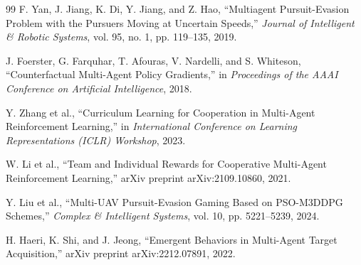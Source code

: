 \documentclass[conference]{IEEEtran}
\begin{document}
\begin{thebibliography}{99}
F. Yan, J. Jiang, K. Di, Y. Jiang, and Z. Hao,
``Multiagent Pursuit-Evasion Problem with the Pursuers Moving at Uncertain Speeds,''
\textit{Journal of Intelligent \& Robotic Systems}, vol. 95, no. 1, pp. 119--135, 2019.

J. Foerster, G. Farquhar, T. Afouras, V. Nardelli, and S. Whiteson,
``Counterfactual Multi-Agent Policy Gradients,''
in \textit{Proceedings of the AAAI Conference on Artificial Intelligence}, 2018.

Y. Zhang et al.,
``Curriculum Learning for Cooperation in Multi-Agent Reinforcement Learning,''
in \textit{International Conference on Learning Representations (ICLR) Workshop}, 2023.

W. Li et al.,
``Team and Individual Rewards for Cooperative Multi-Agent Reinforcement Learning,''
arXiv preprint arXiv:2109.10860, 2021.

Y. Liu et al.,
``Multi-UAV Pursuit-Evasion Gaming Based on PSO-M3DDPG Schemes,''
\textit{Complex \& Intelligent Systems}, vol. 10, pp. 5221--5239, 2024.

H. Haeri, K. Shi, and J. Jeong,
``Emergent Behaviors in Multi-Agent Target Acquisition,''
arXiv preprint arXiv:2212.07891, 2022.

\end{thebibliography}
\end{document}
